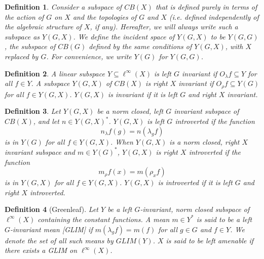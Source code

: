\documentclass[landscape]{slides}
\newtheorem{defn}{Definition}
\begin{document}
\begin{slide}
\begin{defn}
Consider a subspace of $CB(X)$ that is defined purely in terms of the action of $G$ on $X$
and the topologies of $G$ and $X$ (i.e. defined independently of the algebraic structure of $X$, if any).
Hereafter, we will always write such a subspace as $Y(G,X)$.  We define the
{\it incident space of $Y(G,X)$} to be $Y(G,G)$, the subspace
of $CB(G)$ defined by the same conditions of $Y(G,X)$, with $X$ replaced by $G$.
For convenience, we write $Y(G)$ for $Y(G,G)$.\\
\end{defn}

\begin{defn}
A linear subspace $Y \subseteq \ell^\infty(X)$ is {\it left $G$ invariant} if
$O_\lambda f \subseteq Y$ for all $f\in Y$.
A subspace $Y(G,X)$ of $CB(X)$ is {\it right $X$ invariant} if
$O_\rho f \subseteq Y(G)$ for all $f\in Y(G,X)$.
$Y(G,X)$ is {\it invariant} if it is left $G$ and right $X$ invariant.\\
\end{defn}
\end{slide}

\begin{slide}
\begin{defn}
Let $Y(G,X)$ be a norm closed, left $G$ invariant subspace of $CB(X)$, and
let $n\in Y(G,X)^*$.
$Y(G,X)$ is {\it left $G$ introverted}
if the function
\[
n_\lambda f(g) = n(\lambda_g f)
\]
is in $Y(G)$ for all $f\in Y(G,X)$.
When $Y(G,X)$ is a norm closed, right $X$ invariant subspace and $m\in Y(G)^*$,
$Y(G,X)$ is {\it right $X$ introverted}
if the function
\[
m_\rho f(x) = m(\rho_x f)
\]
is in $Y(G,X)$ for all $f\in Y(G,X)$.
$Y(G,X)$ is {\it introverted} if it is left $G$ and right $X$ introverted.
\end{defn}
\end{slide}

\begin{slide}
\begin{defn}[Greenleaf]\label{aa}
Let $Y$ be a left $G$-invariant, norm closed subspace of $\ell^\infty(X)$ containing the constant
functions.  A mean $m\in Y^*$ is said to be a {\it left $G$-invariant mean} [GLIM] if
$m(\lambda_g f) = m(f)$ for all $g\in G$ and $f\in Y$.  We denote the set of all such means by $GLIM(Y)$.
$X$ is said to be {\it left amenable} if there exists a GLIM on $\ell^\infty(X)$.
\end{defn}
\end{slide}
\end{document}
